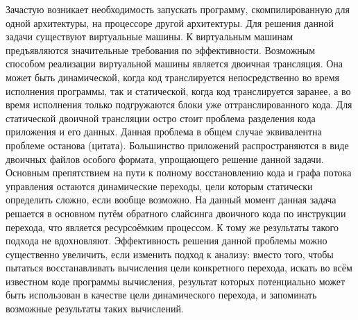 
{\actuality} %

Зачастую возникает необходимость запускать программу, скомпилированную для одной архитектуры,
на процессоре другой архитектуры. Для решения данной задачи существуют виртуальные машины.
К виртуальным машинам предъявляются значительные требования по эффективности.
Возможным способом реализации виртуальной машины является двоичная трансляция. Она может быть
динамической, когда код транслируется непосредственно во время исполнения программы, так и
статической, когда код транслируется заранее, а во время исполнения только подгружаются блоки
уже оттранслированного кода. Для статической двоичной трансляции остро стоит проблема разделения
кода приложения и его данных. Данная проблема в общем случае эквивалентна проблеме останова (цитата).
Большинство приложений распространяются в виде двоичных файлов особого формата, упрощающего
решение данной задачи. Основным препятствием на пути к полному восстановлению кода и графа потока
управления остаются динамические переходы, цели которым статически определить сложно, если вообще возможно.
На данный момент данная задача решается в основном путём обратного слайсинга двоичного кода по инструкции
перехода, что является ресурсоёмким процессом. К тому же результаты такого подхода не вдохновляют.
Эффективность решения данной проблемы можно существенно увеличить, если изменить подход к анализу:
вместо того, чтобы пытаться восстанавливать вычисления цели конкретного перехода, искать во всём
известном коде программы вычисления, результат которых потенциально может быть использован в качестве
цели динамического перехода, и запоминать возможные результаты таких вычислений.

\ifsynopsis
\else
\fi


